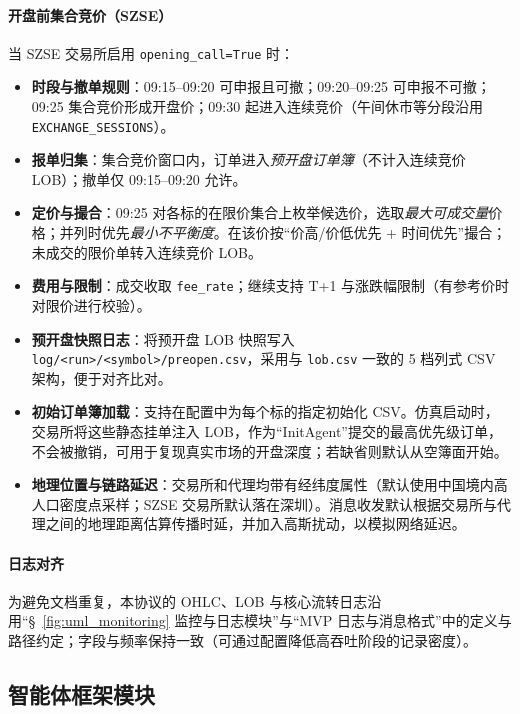 \paragraph{开盘前集合竞价（SZSE）}
当 SZSE 交易所启用 \verb|opening_call=True| 时：
\begin{itemize}
  \item \textbf{时段与撤单规则}：09:15--09:20 可申报且可撤；09:20--09:25 可申报不可撤；09:25 集合竞价形成开盘价；09:30 起进入连续竞价（午间休市等分段沿用 \verb|EXCHANGE_SESSIONS|）。
  \item \textbf{报单归集}：集合竞价窗口内，订单进入\emph{预开盘订单簿}（不计入连续竞价 LOB）；撤单仅 09:15--09:20 允许。
  \item \textbf{定价与撮合}：09:25 对各标的在限价集合上枚举候选价，选取\emph{最大可成交量}价格；并列时优先\emph{最小不平衡度}。在该价按“价高/价低优先 + 时间优先”撮合；未成交的限价单转入连续竞价 LOB。
  \item \textbf{费用与限制}：成交收取 \verb|fee_rate|；继续支持 T+1 与涨跌幅限制（有参考价时对限价进行校验）。
  \item \textbf{预开盘快照日志}：将预开盘 LOB 快照写入 \verb|log/<run>/<symbol>/preopen.csv|，采用与 \verb|lob.csv| 一致的 5 档列式 CSV 架构，便于对齐比对。
  \item \textbf{初始订单簿加载}：支持在配置中为每个标的指定初始化 CSV。仿真启动时，交易所将这些静态挂单注入 LOB，作为“InitAgent”提交的最高优先级订单，不会被撤销，可用于复现真实市场的开盘深度；若缺省则默认从空簿面开始。
  \item \textbf{地理位置与链路延迟}：交易所和代理均带有经纬度属性（默认使用中国境内高人口密度点采样；SZSE 交易所默认落在深圳）。消息收发默认根据交易所与代理之间的地理距离估算传播时延，并加入高斯扰动，以模拟网络延迟。
\end{itemize}

\paragraph{日志对齐}
为避免文档重复，本协议的 OHLC、LOB 与核心流转日志沿用“\S~\ref{fig:uml_monitoring} 监控与日志模块”与“MVP 日志与消息格式”中的定义与路径约定；字段与频率保持一致（可通过配置降低高吞吐阶段的记录密度）。

\subsection{智能体框架模块}

